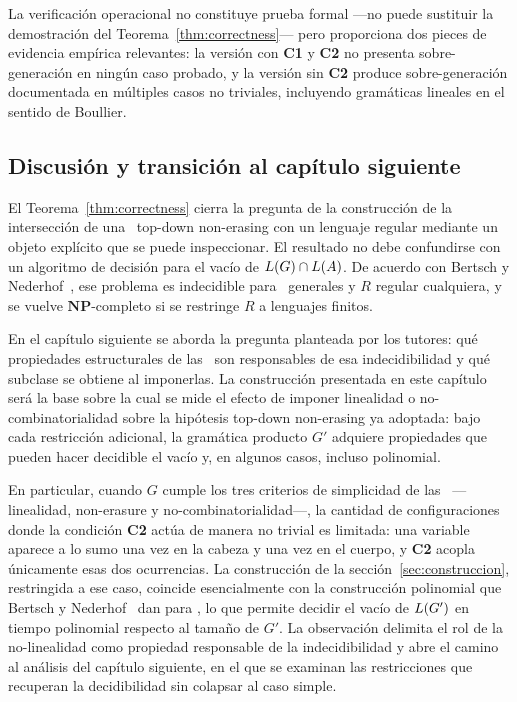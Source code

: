 La verificación operacional no constituye prueba formal ---no puede sustituir la demostración del Teorema~\ref{thm:correctness}--- pero proporciona dos pieces de evidencia empírica relevantes: la versión con \textbf{C1} y \textbf{C2} no presenta sobre-generación en ningún caso probado, y la versión sin \textbf{C2} produce sobre-generación documentada en múltiples casos no triviales, incluyendo gramáticas lineales en el sentido de Boullier.

\subsection{Discusión y transición al capítulo siguiente}\label{sec:transicion}

El Teorema~\ref{thm:correctness} cierra la pregunta de la construcción de la intersección de una \PRCG\ top-down non-erasing con un lenguaje regular mediante un objeto explícito que se puede inspeccionar. El resultado no debe confundirse con un algoritmo de decisión para el vacío de $L(G) \cap L(A)$. De acuerdo con Bertsch y Nederhof~\cite{REF}, ese problema es indecidible para \PRCG\ generales y $R$ regular cualquiera, y se vuelve $\mathbf{NP}$-completo si se restringe $R$ a lenguajes finitos.

En el capítulo siguiente se aborda la pregunta planteada por los tutores: qué propiedades estructurales de las \PRCG\ son responsables de esa indecidibilidad y qué subclase se obtiene al imponerlas. La construcción presentada en este capítulo será la base sobre la cual se mide el efecto de imponer linealidad o no-combinatorialidad sobre la hipótesis top-down non-erasing ya adoptada: bajo cada restricción adicional, la gramática producto $G'$ adquiere propiedades que pueden hacer decidible el vacío y, en algunos casos, incluso polinomial.

En particular, cuando $G$ cumple los tres criterios de simplicidad de las \sRCG\ ---linealidad, non-erasure y no-combinatorialidad---, la cantidad de configuraciones donde la condición \textbf{C2} actúa de manera no trivial es limitada: una variable aparece a lo sumo una vez en la cabeza y una vez en el cuerpo, y \textbf{C2} acopla únicamente esas dos ocurrencias. La construcción de la sección~\ref{sec:construccion}, restringida a ese caso, coincide esencialmente con la construcción polinomial que Bertsch y Nederhof~\cite{REF} dan para \sRCG, lo que permite decidir el vacío de $L(G')$ en tiempo polinomial respecto al tamaño de $G'$. La observación delimita el rol de la no-linealidad como propiedad responsable de la indecidibilidad y abre el camino al análisis del capítulo siguiente, en el que se examinan las restricciones que recuperan la decidibilidad sin colapsar al caso simple.


